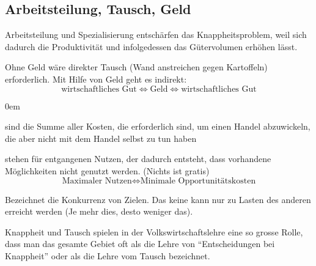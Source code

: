 \subsection{Arbeitsteilung, Tausch, Geld}
Arbeitsteilung und Spezialisierung entschärfen das Knappheitsproblem, weil sich dadurch
die Produktivität und infolgedessen das Gütervolumen erhöhen lässt.

Ohne Geld wäre direkter Tausch (Wand anstreichen gegen Kartoffeln) erforderlich.
Mit Hilfe von Geld geht es indirekt:
\begin{equation*}
	\mbox{wirtschaftliches Gut} \Leftrightarrow \mbox{Geld} \Leftrightarrow \mbox{wirtschaftliches Gut}
\end{equation*}

\begin{description}\itemsep0em
	\item [Transaktionskosten] sind die Summe aller Kosten, die erforderlich sind, um einen Handel abzuwickeln, die aber nicht mit dem Handel selbst zu tun haben
	\item [Opportunitätskosten] stehen für entgangenen Nutzen, der dadurch entsteht, dass vorhandene Möglichkeiten nicht genutzt werden. (Nichts ist gratis)
	\begin{equation*}
		\mbox{Maximaler Nutzen} \Leftrightarrow \mbox{Minimale Opportunitätskosten}
	\end{equation*}
	\item [Trade-off] Bezeichnet die Konkurrenz von Zielen. Das keine kann nur zu Lasten des anderen erreicht werden (Je mehr dies, desto weniger das).
\end{description}

Knappheit und Tausch spielen in der Volkswirtschaftslehre eine so grosse Rolle,
dass man das gesamte Gebiet oft als die Lehre von \enquote{Entscheidungen bei Knappheit}
oder als die Lehre vom Tausch bezeichnet.

